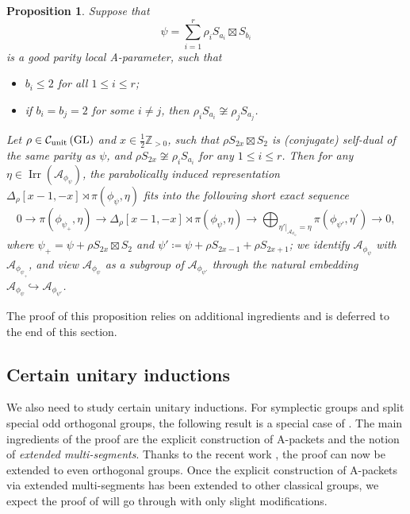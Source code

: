 \documentclass[11pt,letterpaper]{amsart}
\theoremstyle{plain}
\newcounter{theorem}[section]
\numberwithin{theorem}{section}
\numberwithin{equation}{subsection}
\newtheorem{Prop}[theorem]{Proposition}
\theoremstyle{remark}
\newcommand{\GL}{\operatorname{GL}}
\newcommand{\Irr}{\operatorname{Irr}}
\newcommand{\Z}{\mathbb{Z}}
\newcommand{\unit}{{\rm unit}}
\def\calA{\mathcal{A}}
\def\calC{\mathcal{C}}
\def\lra{\longrightarrow}
\begin{document}
\begin{Prop}\label{P:non-unitaryInd-1}
Suppose that
\[
    \psi = \sum_{i=1}^r \rho_i S_{a_i}\boxtimes S_{b_i} 
\]
is a good parity local A-parameter, such that
\begin{itemize}
    \item $b_i\leq 2$ for all $1\leq i\leq r$;

    \vskip 5pt

    \item if $b_i=b_j=2$ for some $i\neq j$, then $\rho_i S_{a_i}\not\cong \rho_j S_{a_j}$.
\end{itemize}
Let $\rho\in\calC_{\unit}\left(\GL\right)$ and $x\in\frac{1}{2}\Z_{>0}$, such that $\rho S_{2x}\boxtimes S_2$ is (conjugate) self-dual of the same parity as $\psi$, and $\rho S_{2x}\not\cong \rho_i S_{a_i}$ for any $1\leq i\leq r$. Then for any $\eta\in\Irr\left(\calA_{\phi_\psi}\right)$, the parabolically induced representation $\Delta_\rho\left[x-1,-x\right] \rtimes \pi\left(\phi_\psi,\eta\right)$ fits into the following short exact sequence
\[
    0 \lra \pi\left(\phi_{\psi_+},\eta\right) \lra \Delta_\rho\left[x-1,-x\right] \rtimes \pi\left(\phi_\psi,\eta\right) \lra \bigoplus_{\eta'|_{\calA_{\phi_{\psi}}}=\eta}\pi\left(\phi_{\psi'},\eta'\right) \lra 0,
\]
where $\psi_+ = \psi + \rho S_{2x}\boxtimes S_2$ and $\psi'\coloneqq \psi + \rho S_{2x-1} + \rho S_{2x+1}$; we identify $\calA_{\phi_\psi}$ with $\calA_{\phi_{\psi_+}}$, and view $\calA_{\phi_\psi}$ as a subgroup of $\calA_{\phi_{\psi'}}$ through the natural embedding $\calA_{\phi_\psi}\hookrightarrow\calA_{\phi_{\psi'}}$.
\end{Prop}

\vskip 5pt

The proof of this proposition relies on additional ingredients and is deferred to the end of this section.

\vskip 5pt

\subsection{Certain unitary inductions} %
\label{sub:certain_unitary_inductions}

We also need to study certain unitary inductions. For symplectic groups and split special odd orthogonal groups, the following result is a special case of \cite[Thm. 4.4]{MR4412277}. The main ingredients of the proof are the explicit construction of A-packets and the notion of \emph{extended multi-segments}. Thanks to the recent work \cite{HLLEvenOrthogonal26}, the proof can now be extended to even orthogonal groups. Once the explicit construction of A-packets via extended multi-segments has been extended to other classical groups, we expect the proof of \cite[Thm. 4.4]{MR4412277} will go through with only slight modifications. %
\end{document}

